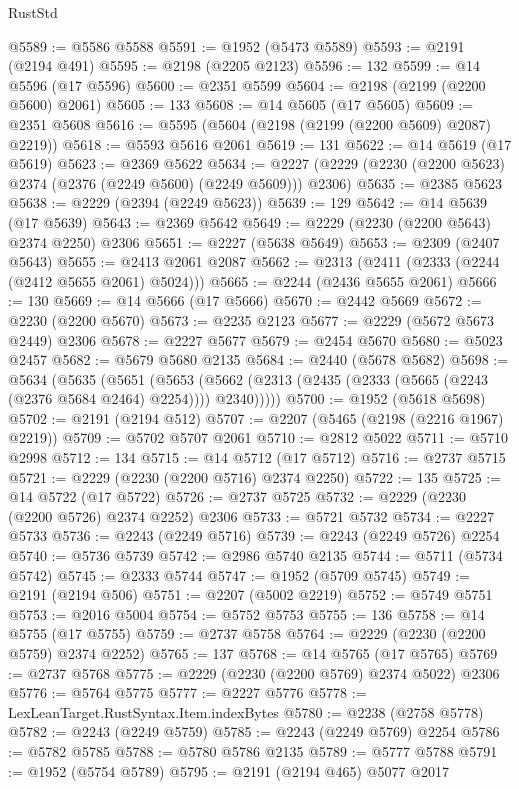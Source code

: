 \begin{lexlean}{RustStd}
\begin{coremodule}
{\begin{coremodule}
{{{{{{{{{{{{{{{{{{{{{{{{{{{{{{{{{{@5589 := @5586 @5588
@5591 := @1952 (@5473 @5589)
@5593 := @2191 (@2194 @491)
@5595 := @2198 (@2205 @2123)
@5596 := 132
@5599 := @14 @5596 (@17 @5596)
@5600 := @2351 @5599
@5604 := @2198 (@2199 (@2200 @5600) @2061)
@5605 := 133
@5608 := @14 @5605 (@17 @5605)
@5609 := @2351 @5608
@5616 := @5595 (@5604 (@2198 (@2199 (@2200 @5609) @2087) @2219))
@5618 := @5593 @5616 @2061
@5619 := 131
@5622 := @14 @5619 (@17 @5619)
@5623 := @2369 @5622
@5634 := @2227 (@2229 (@2230 (@2200 @5623) @2374 (@2376 (@2249 @5600) (@2249 @5609))) @2306)
@5635 := @2385 @5623
@5638 := @2229 (@2394 (@2249 @5623))
@5639 := 129
@5642 := @14 @5639 (@17 @5639)
@5643 := @2369 @5642
@5649 := @2229 (@2230 (@2200 @5643) @2374 @2250) @2306
@5651 := @2227 (@5638 @5649)
@5653 := @2309 (@2407 @5643)
@5655 := @2413 @2061 @2087
@5662 := @2313 (@2411 (@2333 (@2244 (@2412 @5655 @2061) @5024)))
@5665 := @2244 (@2436 @5655 @2061)
@5666 := 130
@5669 := @14 @5666 (@17 @5666)
@5670 := @2442 @5669
@5672 := @2230 (@2200 @5670)
@5673 := @2235 @2123
@5677 := @2229 (@5672 @5673 @2449) @2306
@5678 := @2227 @5677
@5679 := @2454 @5670
@5680 := @5023 @2457
@5682 := @5679 @5680 @2135
@5684 := @2440 (@5678 @5682)
@5698 := @5634
    (@5635
      (@5651
        (@5653 (@5662 (@2313 (@2435 (@2333 (@5665 (@2243 (@2376 @5684 @2464) @2254)))) @2340)))))
@5700 := @1952 (@5618 @5698)
@5702 := @2191 (@2194 @512)
@5707 := @2207 (@5465 (@2198 (@2216 @1967) @2219))
@5709 := @5702 @5707 @2061
@5710 := @2812 @5022
@5711 := @5710 @2998
@5712 := 134
@5715 := @14 @5712 (@17 @5712)
@5716 := @2737 @5715
@5721 := @2229 (@2230 (@2200 @5716) @2374 @2250)
@5722 := 135
@5725 := @14 @5722 (@17 @5722)
@5726 := @2737 @5725
@5732 := @2229 (@2230 (@2200 @5726) @2374 @2252) @2306
@5733 := @5721 @5732
@5734 := @2227 @5733
@5736 := @2243 (@2249 @5716)
@5739 := @2243 (@2249 @5726) @2254
@5740 := @5736 @5739
@5742 := @2986 @5740 @2135
@5744 := @5711 (@5734 @5742)
@5745 := @2333 @5744
@5747 := @1952 (@5709 @5745)
@5749 := @2191 (@2194 @506)
@5751 := @2207 (@5002 @2219)
@5752 := @5749 @5751
@5753 := @2016 @5004
@5754 := @5752 @5753
@5755 := 136
@5758 := @14 @5755 (@17 @5755)
@5759 := @2737 @5758
@5764 := @2229 (@2230 (@2200 @5759) @2374 @2252)
@5765 := 137
@5768 := @14 @5765 (@17 @5765)
@5769 := @2737 @5768
@5775 := @2229 (@2230 (@2200 @5769) @2374 @5022) @2306
@5776 := @5764 @5775
@5777 := @2227 @5776
@5778 := LexLeanTarget.RustSyntax.Item.indexBytes
@5780 := @2238 (@2758 @5778)
@5782 := @2243 (@2249 @5759)
@5785 := @2243 (@2249 @5769) @2254
@5786 := @5782 @5785
@5788 := @5780 @5786 @2135
@5789 := @5777 @5788
@5791 := @1952 (@5754 @5789)
@5795 := @2191 (@2194 @465) @5077 @2017
}}}}}}}}}}}}}}}}}}}}}}}}}}}}}}}}}}
\end{coremodule}}
\end{coremodule}
\end{lexlean}
